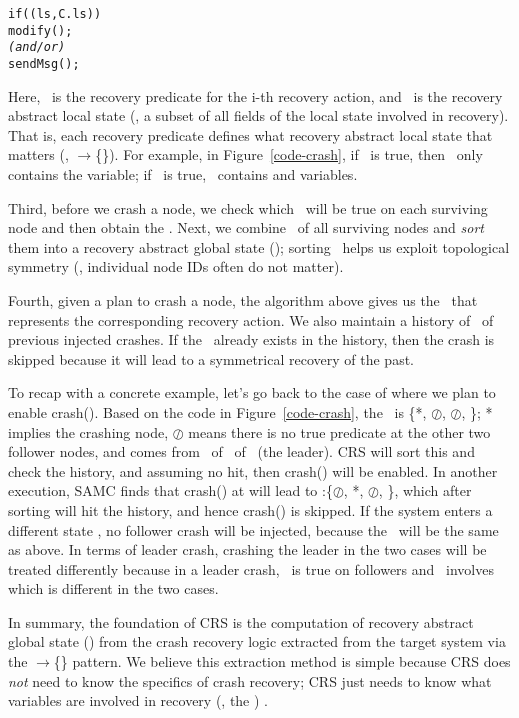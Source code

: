 \vmintwo
{\small
\begin{alltt}
    if (\pri(ls, C.ls)) 
       modify(\ralsi); 
       \textit{(and/or)}
       sendMsg(\ralsi);
\end{alltt}
}
\vmintwo

Here, \pri\ is the recovery predicate for the i-th recovery action, and 
\ralsi\ is the recovery abstract local state 
(\ie, a subset of all fields of the local state involved in 
recovery).  That is, each recovery predicate defines what recovery
abstract local state that matters (\ie, \pri$\rightarrow$\{\ralsi\}).  For example, in Figure~\ref{code-crash},
if \prone\ is true, then \ralsone\ only contains the 
variable; if \prtri\ is true, \ralstri\ contains 
and  variables.

Third, before we crash a node, we check which \pri\ will be true on
each surviving node and then obtain the \ralsi.  Next, we combine
\ralsi\ of all surviving nodes and {\em sort} them into a recovery
abstract global state (\rags);  sorting \rags\ helps us exploit
topological symmetry (\eg,  individual node IDs often do not matter).


Fourth, given a plan to crash a node, the algorithm above 
gives us the \rags\ that represents the corresponding recovery action.
We also maintain a history of \rags\ of previous injected crashes.
If the \rags\ already exists in the history, then the crash is skipped
because it will lead to a symmetrical recovery of the past.


To recap with a concrete example, let's go back to the case
of  where we plan to enable crash(\none).  Based on the code
in Figure~\ref{code-crash}, the \rags\ is \{*, $\oslash$,
$\oslash$, \}; 
* implies the crashing node, 
$\oslash$ means there is no true
predicate at the other two follower nodes, and  comes
from \ralsone\ of \prone\ of \nfour\ (the leader).  CRS will sort this
and check the history, and assuming no hit, then crash(\none) will be
enabled.  In another execution, SAMC finds that crash(\ntwo)
at  will lead to \rags:\{$\oslash$, *,
$\oslash$, \}, which after sorting will hit the
history, and hence crash(\ntwo) is skipped.  If the system enters a
different state , no follower crash will be injected, because
the \rags\ will be the same as above.  In terms of leader crash,
crashing the leader in the two cases will be treated differently
because in a leader crash, \prtri\ is true on followers and \prtri\
involves  which is different in the two cases.

In summary, the foundation of CRS is the computation of recovery
abstract global state (\rags) from the crash recovery logic extracted
from the target system via the \pri$\rightarrow$\{\ralsi\} pattern.
We believe this extraction method is simple because CRS does {\em not}
need to know the specifics of crash recovery; CRS just needs to know
what variables are involved in recovery (\ie, the \rals) .


